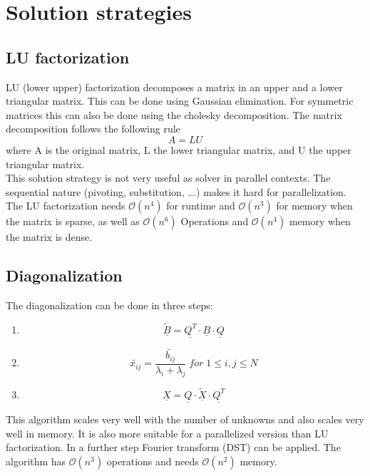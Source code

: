 \documentclass{article}
\begin{document}
\section{Solution strategies}
\subsection{LU factorization}
LU (lower upper) factorization decomposes a matrix in an upper and a lower triangular matrix. This can be done using Gaussian elimination. For symmetric matrices this can also be done using the cholesky decomposition. The matrix decomposition follows the following rule
\begin{equation}
A=LU
\end{equation}
where A is the original matrix, L the lower triangular matrix, and U the upper triangular matrix.\\
This solution strategy is not very useful as solver in parallel contexts. The sequential nature (pivoting, substitution, ...) makes it hard for parallelization. The LU factorization needs $\mathcal{O}(n^4)$ for runtime and $\mathcal{O}(n^3)$ for memory when the matrix is sparse, as well as $\mathcal{O}(n^6)$ Operations and $\mathcal{O}(n^4)$ memory when the matrix is dense.
\subsection{Diagonalization}
The diagonalization can be done in three steps:
\begin{enumerate}
\item $$\underline{\tilde{B}}=\underline{Q^T}\cdot\underline{B}\cdot\underline{Q}$$
\item $$\tilde{x_{ij}}=\frac{\tilde{b_{ij}}}{\lambda_i+\lambda_j}\;for\;1\leq i,j \leq N$$
\item $$\underline{X}=\underline{Q}\cdot\underline{\tilde{X}}\cdot\underline{Q^T}$$
\end{enumerate}
This algorithm scales very well with the number of unknowns and also scales very well in memory. It is also more suitable for a parallelized version than LU factorization. In a further step Fourier transform (DST) can be applied. The algorithm has $\mathcal{O}(n^3)$ operations and needs $\mathcal{O}(n^2)$ memory.
\end{document}
